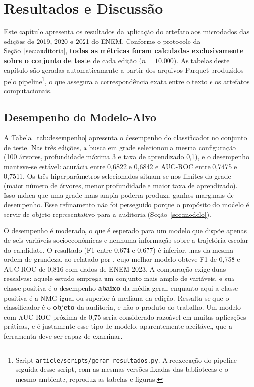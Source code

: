 \chapter{Resultados e Discussão}
\label{cap:resultados}

Este capítulo apresenta os resultados da aplicação do artefato aos microdados das edições de 2019, 2020 e 2021 do ENEM. Conforme o protocolo da Seção~\ref{sec:auditoria}, \textbf{todas as métricas foram calculadas exclusivamente sobre o conjunto de teste} de cada edição ($n = 10.000$). As tabelas deste capítulo são geradas automaticamente a partir dos arquivos Parquet produzidos pelo pipeline\footnote{Script \texttt{article/scripts/gerar\_resultados.py}. A reexecução do pipeline seguida desse script, com as mesmas versões fixadas das bibliotecas e o mesmo ambiente, reproduz as tabelas e figuras.}, o que assegura a correspondência exata entre o texto e os artefatos computacionais.

\section{Desempenho do Modelo-Alvo}
\label{sec:res_desempenho}

A Tabela~\ref{tab:desempenho} apresenta o desempenho do classificador no conjunto de teste. Nas três edições, a busca em grade selecionou a mesma configuração (100 árvores, profundidade máxima 3 e taxa de aprendizado 0,1), e o desempenho manteve-se estável: acurácia entre 0,6822 e 0,6842 e AUC-ROC entre 0,7475 e 0,7511. Os três hiperparâmetros selecionados situam-se nos limites da grade (maior número de árvores, menor profundidade e maior taxa de aprendizado). Isso indica que uma grade mais ampla poderia produzir ganhos marginais de desempenho. Esse refinamento não foi perseguido porque o propósito do modelo é servir de objeto representativo para a auditoria (Seção~\ref{sec:modelo}).



O desempenho é moderado, o que é esperado para um modelo que dispõe apenas de seis variáveis socioeconômicas e nenhuma informação sobre a trajetória escolar do candidato. O resultado (F1 entre 0,674 e 0,677) é inferior, mas da mesma ordem de grandeza, ao relatado por , cujo melhor modelo obteve F1 de 0,758 e AUC-ROC de 0,816 com dados do ENEM 2023. A comparação exige duas ressalvas: aquele estudo emprega um conjunto mais amplo de variáveis, e sua classe positiva é o desempenho \textbf{abaixo} da média geral, enquanto aqui a classe positiva é a NMG igual ou superior à mediana da edição. Ressalta-se que o classificador é o \textbf{objeto} da auditoria, e não o produto do trabalho. Um modelo com AUC-ROC próxima de 0,75 seria considerado razoável em muitas aplicações práticas, e é justamente esse tipo de modelo, aparentemente aceitável, que a ferramenta deve ser capaz de examinar.


